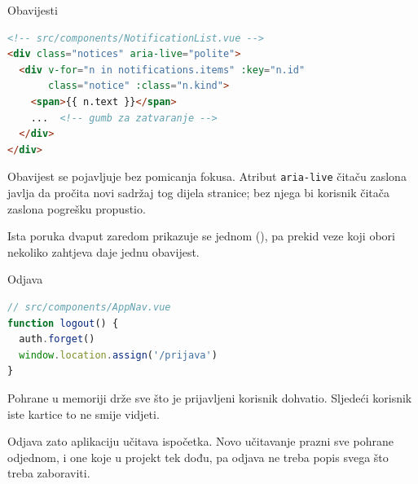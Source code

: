 \begin{frame}[fragile]{Obavijesti}
\begin{lstlisting}[language=html]
<!-- src/components/NotificationList.vue -->
<div class="notices" aria-live="polite">
  <div v-for="n in notifications.items" :key="n.id"
       class="notice" :class="n.kind">
    <span>{{ n.text }}</span>
    ...  <!-- gumb za zatvaranje -->
  </div>
</div>
\end{lstlisting}

\vspace{0.4em}
Obavijest se pojavljuje bez pomicanja fokusa. Atribut \texttt{aria-live} čitaču zaslona javlja da pročita novi sadržaj tog dijela stranice; bez njega bi korisnik čitača zaslona pogrešku propustio.

\vspace{0.4em}
Ista poruka dvaput zaredom prikazuje se jednom (), pa prekid veze koji obori nekoliko zahtjeva daje jednu obavijest.
\end{frame}

\begin{frame}[fragile]{Odjava}
\begin{lstlisting}[language=typescript]
// src/components/AppNav.vue
function logout() {
  auth.forget()
  window.location.assign('/prijava')
}
\end{lstlisting}

\vspace{0.5em}
Pohrane u memoriji drže sve što je prijavljeni korisnik dohvatio. Sljedeći korisnik iste kartice to ne smije vidjeti.

\vspace{0.5em}
Odjava zato aplikaciju učitava ispočetka. Novo učitavanje prazni sve pohrane odjednom, i one koje u projekt tek dođu, pa odjava ne treba popis svega što treba zaboraviti.
\end{frame}

